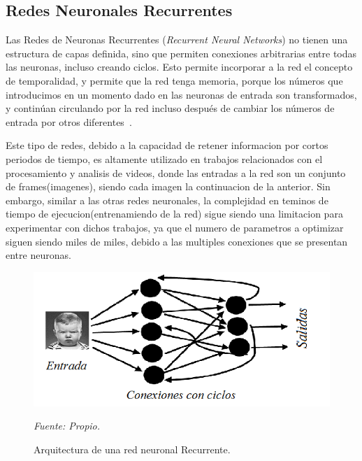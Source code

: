 \subsection{Redes Neuronales Recurrentes}
Las Redes de Neuronas Recurrentes (\textit{Recurrent Neural Networks}) no tienen una estructura de capas definida, sino que permiten conexiones arbitrarias entre todas las neuronas, incluso creando ciclos. Esto permite incorporar a la red el concepto de temporalidad, y permite que la red tenga memoria, porque los números que introducimos en un momento dado en las neuronas de entrada son transformados, y continúan circulando por la red incluso después de cambiar los números de entrada por otros diferentes~\cite{18restrepo2015aplicacion}.

Este tipo de redes, debido a la capacidad de retener informacion por cortos periodos de tiempo, es altamente utilizado en trabajos relacionados con el procesamiento y analisis de videos, donde las entradas a la red son un conjunto de frames(imagenes), siendo cada imagen la continuacion de la anterior. Sin embargo, similar a las otras redes neuronales, la complejidad en teminos de tiempo de ejecucion(entrenamiendo de la red) sigue siendo una limitacion para experimentar con dichos trabajos, ya que el numero de parametros a optimizar siguen siendo miles de miles, debido a las multiples conexiones que se presentan entre neuronas.  


\begin{figure}[H]
		\centering
		\includegraphics[width=130mm]{Imagenes/red_recurrente.png}
		\caption{Arquitectura de una red neuronal Recurrente.}
		\vspace{0.15cm}
		\textit{Fuente: Propio.}
		\label{fig:red_recurrente}
\end{figure}

